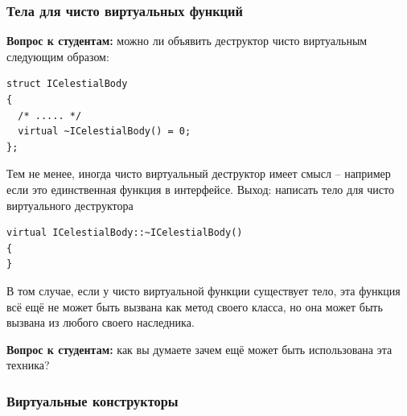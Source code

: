 \documentclass[a4paper,12pt,oneside]{article}
\newif\ifanswers
\begin{document}
\subsubsection{Тела для чисто виртуальных функций}\label{VirtdestrBody}

\textbf{Вопрос к студентам:} можно ли объявить деструктор чисто виртуальным следующим образом:

\begin{lstlisting}
struct ICelestialBody
{
  /* ..... */
  virtual ~ICelestialBody() = 0;
};
\end{lstlisting}

\ifanswers
Правильный ответ: да, можно, но это приведет к pure virtual function call при попытке унчитожить любого наследника такого класса.
\fi

Тем не менее, иногда чисто виртуальный деструктор имеет смысл -- например если это единственная функция в интерфейсе. Выход: написать тело для чисто виртуального деструктора

\begin{lstlisting}
virtual ICelestialBody::~ICelestialBody()
{
}
\end{lstlisting}

В том случае, если у чисто виртуальной функции существует тело, эта функция всё ещё не может быть вызвана как метод своего класса, но она может быть вызвана из любого своего наследника.

\textbf{Вопрос к студентам:} как вы думаете зачем ещё может быть использована эта техника?

\ifanswers
Возможный ответ: для организации разумного поведения по умолчанию, которое наследники должны явно вызывать:

\begin{lstlisting}
class B 
{
public:
  virtual bool f() = 0;
};

bool 
B::f() 
{
  return true;  // this is a good default, but
}               // shouldn't be used blindly

class D : public B 
{
public:
  bool f() 
  {
    return B::f(); // if D wants the default
  }                // behaviour, it has to say so
};
\end{lstlisting}

Но тут возможны и другие варианты: например выдать лучшее сообщение об ошибке чем компилятор и выйти.
\fi

\subsubsection{Виртуальные конструкторы}
\end{document}
